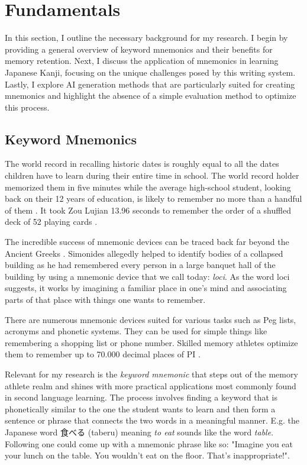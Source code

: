 \section{Fundamentals} \label{sec:fundamentals}
In this section, I outline the necessary background for my research. I begin by providing a general overview of keyword mnemonics and their benefits for memory retention. Next, I discuss the application of mnemonics in learning Japanese Kanji, focusing on the unique challenges posed by this writing system. Lastly, I explore AI generation methods that are particularly suited for creating mnemonics and highlight the absence of a simple evaluation method to optimize this process.
\subsection{Keyword Mnemonics}
The world record in recalling historic dates is roughly equal to all the dates children have to learn during their entire time in school. The world record holder memorized them in five minutes while the average high-school student, looking back on their 12 years of education, is likely to remember no more than a handful of them \cite{how_to_become_a_memory_master}. It took Zou Lujian 13.96 seconds to remember the order of a shuffled deck of 52 playing cards \cite{record_recall_playing_cards}.

The incredible success of mnemonic devices can be traced back far beyond the Ancient Greeks \cite{white_2014}. Simonides allegedly helped to identify bodies of a collapsed building as he had remembered every person in a large banquet hall of the building by using a mnemonic device that we call today: \emph{loci}. As the word loci suggests, it works by imagining a familiar place in one's mind and associating parts of that place with things one wants to remember.

There are numerous mnemonic devices suited for various tasks such as Peg lists, acronyms and phonetic systems. They can be used for simple things like remembering a shopping list or phone number. Skilled memory athletes optimize them to remember up to 70.000 decimal places of PI \cite{record_decimal_pi}. 

Relevant for my research is the \emph{keyword mnemonic} that steps out of the memory athlete realm and shines with more practical applications most commonly found in second language learning. The process involves finding a keyword that is phonetically similar to the one the student wants to learn and then form a sentence or phrase that connects the two words in a meaningful manner. E.g. the Japanese word 食べる (taberu) meaning \emph{to eat} sounds like the word \emph{table}. Following one could come up with a mnemonic phrase like so: "Imagine you eat your lunch on the table. You wouldn't eat on the floor. That's inappropriate!". 


